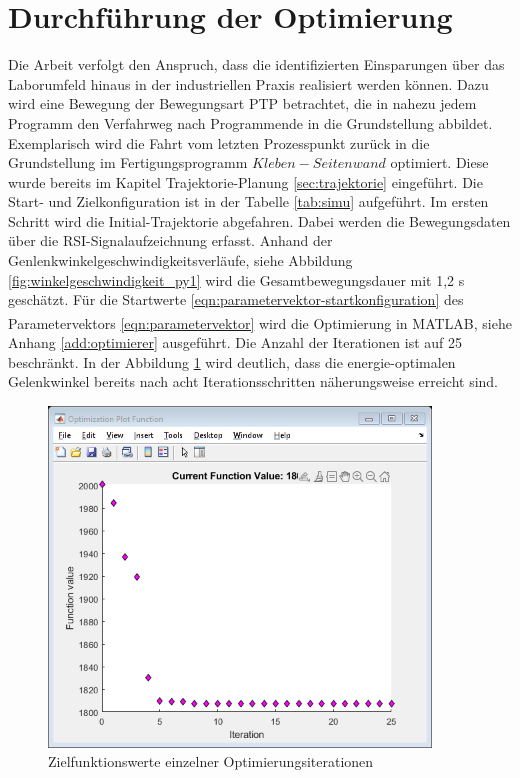 \section{Durchführung der Optimierung}
Die Arbeit verfolgt den Anspruch, dass die identifizierten Einsparungen über das Laborumfeld hinaus in der industriellen Praxis realisiert werden können. Dazu wird eine Bewegung der Bewegungsart PTP betrachtet, die in nahezu jedem Programm den Verfahrweg nach Programmende in die Grundstellung abbildet. Exemplarisch wird die Fahrt vom letzten Prozesspunkt zurück in die Grundstellung im Fertigungsprogramm  $Kleben-Seitenwand$  optimiert. Diese wurde bereits im Kapitel Trajektorie-Planung \ref{sec:trajektorie} eingeführt. Die Start- und Zielkonfiguration ist in der Tabelle \ref{tab:simu} aufgeführt.  Im ersten Schritt wird die Initial-Trajektorie abgefahren. Dabei werden die Bewegungsdaten über die RSI-Signalaufzeichnung erfasst. Anhand der Genlenkwinkelgeschwindigkeitsverläufe, siehe Abbildung \ref{fig:winkelgeschwindigkeit_py1} wird die Gesamtbewegungsdauer mit 1,2 s geschätzt. Für die Startwerte \ref{eqn:parametervektor-startkonfiguration} des Parametervektors \ref{eqn:parametervektor} wird die Optimierung in MATLAB\textsuperscript{\textregistered}, siehe Anhang \ref{add:optimierer} ausgeführt. Die Anzahl der Iterationen ist auf 25 beschränkt. In der Abbildung \ref{fig:funktionswerte-iteration} wird deutlich, dass die energie-optimalen Gelenkwinkel bereits nach acht Iterationsschritten näherungsweise erreicht sind.
%
\begin{figure}[tbph]
	\centering
	\includegraphics [width=4in]{images/optimization_01}
	\caption{Zielfunktionswerte einzelner Optimierungsiterationen}
	\label{fig:funktionswerte-iteration}
\end{figure}
%
